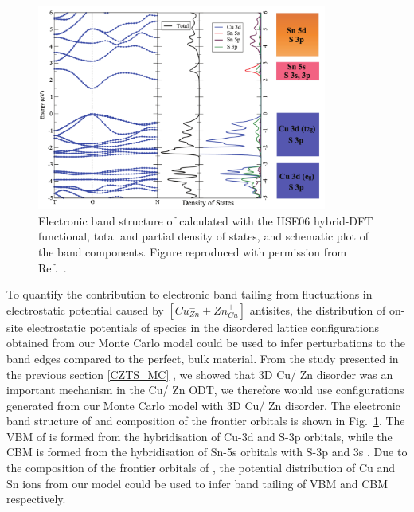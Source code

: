 \documentclass[11pt, twoside]{report}
\begin{document}
\begin{figure}[h!]
  \centering
    \includegraphics[width=0.85\textwidth]{figures/CZTS_band_structure.png}
    \caption[Electronic band structure of {\CZTS} calculated with the HSE06 hybrid-DFT functional, total and partial density of states, and schematic plot of the band components.]{Electronic band structure of {\CZTS} calculated with the HSE06 hybrid-DFT functional, total and partial density of states, and schematic plot of the band components. Figure reproduced with permission from Ref.~.}
  \label{CZTS_band_structure}
\end{figure}

To quantify the contribution to electronic band tailing from fluctuations in electrostatic potential caused by $[Cu_{Zn}^{-} + Zn_{Cu}^{+}]$ antisites, the distribution of on-site electrostatic potentials of species in the disordered lattice configurations obtained from our Monte Carlo model could be used to infer perturbations to the band edges compared to the perfect, bulk material. From the study presented in the previous section \ref{CZTS_MC} \cite{eris_paper}, we showed that 3D Cu/ Zn disorder was an important mechanism in the Cu/ Zn ODT, we therefore would use configurations generated from our Monte Carlo model with 3D Cu/ Zn disorder. The electronic band structure of {\CZTS} and composition of the frontier orbitals is shown in Fig.~\ref{CZTS_band_structure}. 
The VBM of {\CZTS} is formed from the hybridisation of Cu-3d and S-3p orbitals, while the CBM is formed from the hybridisation of Sn-5s orbitals with S-3p and 3s \cite{defects_Chen_large}. Due to the composition of the frontier orbitals of {\CZTS}, the potential distribution of Cu and Sn ions from our model could be used to infer band tailing of VBM and CBM respectively.
\end{document}
